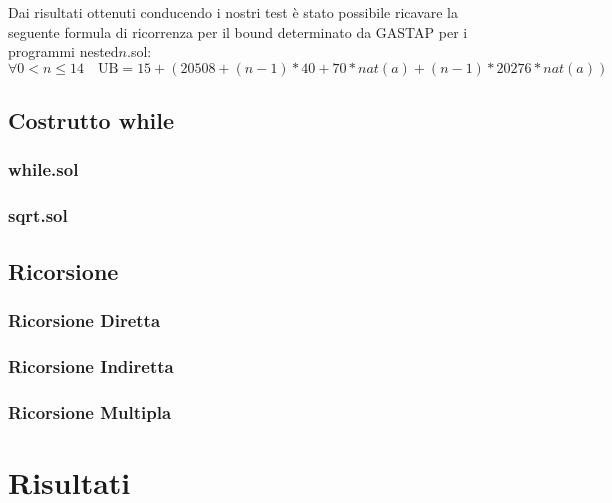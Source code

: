     \begin{minipage}{\linewidth}
    \indent Dai risultati ottenuti conducendo i nostri test è stato possibile ricavare la seguente formula di ricorrenza per il bound determinato da GASTAP per i programmi nested$n$.sol:
    \[ \forall 0 < n \leq 14 \quad \mathrm{UB} = 15 + (20508 + (n - 1)*40 + 70*nat(a) + (n - 1)*20276*nat(a)) \]
    \end{minipage}

    \subsection{Costrutto while}
    
        \subsubsection{while.sol}

        \subsubsection{sqrt.sol}

    \subsection{Ricorsione}

        \subsubsection{Ricorsione Diretta}

        \subsubsection{Ricorsione Indiretta}
        
        \subsubsection{Ricorsione Multipla}
    
\section{Risultati}

